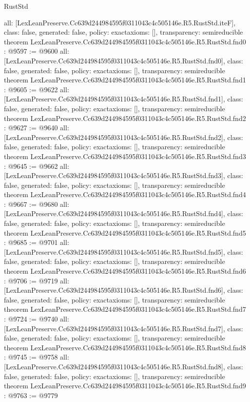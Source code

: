 \begin{lexlean}{RustStd}
\begin{coremodule}
{  all: [LexLeanPreserve.Cc639d244984595f0311043c4c505146e.R5.RustStd.iteF],
  class: false,
  generated: false,
  policy: exact{axioms: []},
  transparency: semireducible
}
theorem LexLeanPreserve.Cc639d244984595f0311043c4c505146e.R5.RustStd.fnd0 : @9597 := @9600 {
  all: [LexLeanPreserve.Cc639d244984595f0311043c4c505146e.R5.RustStd.fnd0],
  class: false,
  generated: false,
  policy: exact{axioms: []},
  transparency: semireducible
}
theorem LexLeanPreserve.Cc639d244984595f0311043c4c505146e.R5.RustStd.fnd1 : @9605 := @9622 {
  all: [LexLeanPreserve.Cc639d244984595f0311043c4c505146e.R5.RustStd.fnd1],
  class: false,
  generated: false,
  policy: exact{axioms: []},
  transparency: semireducible
}
theorem LexLeanPreserve.Cc639d244984595f0311043c4c505146e.R5.RustStd.fnd2 : @9627 := @9640 {
  all: [LexLeanPreserve.Cc639d244984595f0311043c4c505146e.R5.RustStd.fnd2],
  class: false,
  generated: false,
  policy: exact{axioms: []},
  transparency: semireducible
}
theorem LexLeanPreserve.Cc639d244984595f0311043c4c505146e.R5.RustStd.fnd3 : @9645 := @9662 {
  all: [LexLeanPreserve.Cc639d244984595f0311043c4c505146e.R5.RustStd.fnd3],
  class: false,
  generated: false,
  policy: exact{axioms: []},
  transparency: semireducible
}
theorem LexLeanPreserve.Cc639d244984595f0311043c4c505146e.R5.RustStd.fnd4 : @9667 := @9680 {
  all: [LexLeanPreserve.Cc639d244984595f0311043c4c505146e.R5.RustStd.fnd4],
  class: false,
  generated: false,
  policy: exact{axioms: []},
  transparency: semireducible
}
theorem LexLeanPreserve.Cc639d244984595f0311043c4c505146e.R5.RustStd.fnd5 : @9685 := @9701 {
  all: [LexLeanPreserve.Cc639d244984595f0311043c4c505146e.R5.RustStd.fnd5],
  class: false,
  generated: false,
  policy: exact{axioms: []},
  transparency: semireducible
}
theorem LexLeanPreserve.Cc639d244984595f0311043c4c505146e.R5.RustStd.fnd6 : @9706 := @9719 {
  all: [LexLeanPreserve.Cc639d244984595f0311043c4c505146e.R5.RustStd.fnd6],
  class: false,
  generated: false,
  policy: exact{axioms: []},
  transparency: semireducible
}
theorem LexLeanPreserve.Cc639d244984595f0311043c4c505146e.R5.RustStd.fnd7 : @9724 := @9740 {
  all: [LexLeanPreserve.Cc639d244984595f0311043c4c505146e.R5.RustStd.fnd7],
  class: false,
  generated: false,
  policy: exact{axioms: []},
  transparency: semireducible
}
theorem LexLeanPreserve.Cc639d244984595f0311043c4c505146e.R5.RustStd.fnd8 : @9745 := @9758 {
  all: [LexLeanPreserve.Cc639d244984595f0311043c4c505146e.R5.RustStd.fnd8],
  class: false,
  generated: false,
  policy: exact{axioms: []},
  transparency: semireducible
}
theorem LexLeanPreserve.Cc639d244984595f0311043c4c505146e.R5.RustStd.fnd9 : @9763 := @9779 {
}
\end{coremodule}
\end{lexlean}
